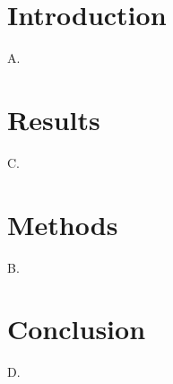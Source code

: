 \documentclass{article}
\begin{document}
\section{Introduction}A.
\section{Results}C.
\section{Methods}B.
\section{Conclusion}D.
\end{document}
